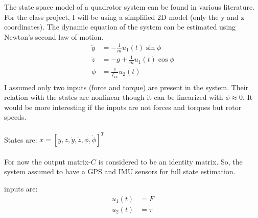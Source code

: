\documentclass[12pt]{article}
\begin{document}
The state space model of a quadrotor system can be found in various literature\cite{K2019}\cite{Schreier2012}. For the class project, I will be using a simplified 2D model (only the y and z coordinates). The dynamic equation of the system can be estimated using Newton's second law of motion.
\begin{align*}
    \ddot{y} &= -\frac{1}{m}u_1(t) \sin{\phi} \\
    \ddot{z} &= -g + \frac{1}{m}u_1(t) \cos{\phi} \\ 
    \ddot{\phi} &= \frac{1}{I_{xx}}u_2(t) \\
\end{align*}
I assumed only two inputs (force and torque) are present in the system. Their relation with the states are nonlinear though it can be linearized with $\phi \approx 0$. It would be more interesting if the inputs are not forces and torques but rotor speeds. \\\\
States are: $x = [y, z, \dot{y}, \dot{z}, \phi, \dot{\phi}]^T$ \\\\
For now the output matrix-$C$ is considered to be an identity matrix. So, the system assumed to have a GPS and IMU sensors for full state estimation.

inputs are:
\begin{align*}
    u_1(t) &= F \\
    u_2(t) &= \tau
\end{align*}
\end{document}
